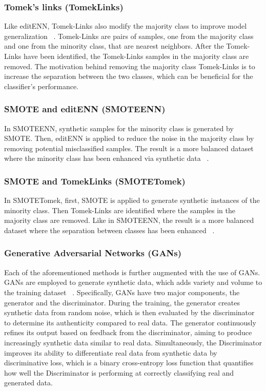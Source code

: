 \subsubsection{Tomek’s links (TomekLinks)}
Like editENN, Tomek-Links also modify the majority class to improve model generalization ~\cite{Elhassan_M_2016}. Tomek-Links are pairs of samples, one from the majority class and one from the minority class, that are nearest neighbors. After the Tomek-Links have been identified, the Tomek-Links samples in the majority class are removed. The motivation behind removing the majority class Tomek-Links is to increase the separation between the two classes, which can be beneficial for the classifier's performance.

\subsubsection{SMOTE and editENN (SMOTEENN)}
In SMOTEENN, synthetic samples for the minority class is generated by SMOTE. Then, editENN is applied to reduce the noise in the majority class by removing potential misclassified samples. The result is a more balanced dataset where the minority class has been enhanced via synthetic data ~\cite{imbalanceLearn}.

\subsubsection{SMOTE and TomekLinks (SMOTETomek)}
In SMOTETomek, first, SMOTE is applied to generate synthetic instances of the minority class. Then Tomek-Links are identified where the samples in the majority class are removed. Like in SMOTEENN, the result is a more balanced dataset where the separation between classes has been enhanced ~\cite{imbalanceLearn}. 

\subsubsection{Generative Adversarial Networks (GANs)}
Each of the aforementioned methods is further augmented with the use of GANs. GANs are employed to generate synthetic data, which adds variety and volume to the training dataset ~\cite{Goodfellow_2014}. Specifically, GANs have two major components, the generator and the discriminator. During the training, the generator creates synthetic data from random noise, which is then evaluated by the discriminator to determine its authenticity compared to real data. The generator continuously refines its output based on feedback from the discriminator, aiming to produce increasingly synthetic data similar to real data. Simultaneously, the Discriminator improves its ability to differentiate real data from synthetic data by discriminative loss, which is a binary cross-entropy loss function that quantifies how well the Discriminator is performing at correctly classifying real and generated data.

